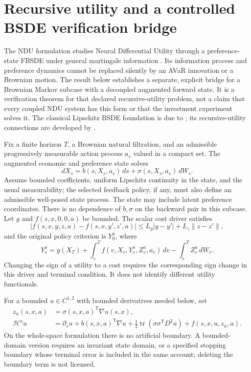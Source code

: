 \section{Recursive utility and a controlled BSDE verification bridge}\label{supp:bridge109}
The NDU formulation studies Neural Differential Utility through a preference-state FBSDE under general martingale information \citep{QiNDU2025}. Its information process and preference dynamics cannot be replaced silently by an AVaR innovation or a Brownian motion. The result below establishes a separate, explicit bridge for a Brownian Markov subcase with a decoupled augmented forward state. It is a verification theorem for that declared recursive-utility problem, not a claim that every coupled NDU system has this form or that the investment experiment solves it. The classical Lipschitz BSDE foundation is due to \citet{PardouxPeng1990}; its recursive-utility connections are developed by \citet{ElKarouiPengQuenez1997}.

Fix a finite horizon $T$, a Brownian natural filtration, and an admissible progressively measurable action process $a_s$ valued in a compact set. The augmented economic and preference state solves
\[
 dX_s=b(s,X_s,a_s)\,ds+\sigma(s,X_s,a_s)\,dW_s.
\]
Assume bounded coefficients, uniform Lipschitz continuity in the state, and the usual measurability; the selected feedback policy, if any, must also define an admissible well-posed state process. The state may include latent preference coordinates. There is no dependence of $b,\sigma$ on the backward pair in this subcase. Let $g$ and $f(s,x,0,0,a)$ be bounded. The scalar cost driver satisfies
\[
 |f(s,x,y,z,a)-f(s,x,y',z',a)|\le L_y|y-y'|+L_z\|z-z'\|,
\]
and the original policy criterion is $Y_0^a$, where
\begin{equation}\label{eq:bsde109}
 Y_s^a=g(X_T)+\int_s^T f(v,X_v,Y_v^a,Z_v^a,a_v)\,dv
                  -\int_s^T Z_v^a\,dW_v.
\end{equation}
Changing the sign of a utility to a cost requires the corresponding sign change in this driver and terminal condition. It does not identify different utility functionals.

For a bounded $u\in C^{1,2}$ with bounded derivatives needed below, set
\begin{align*}
 z_u(s,x,a)&=\sigma(s,x,a)^{\mathsf T}\nabla u(s,x),\\
 \mathcal H^a u&=\partial_su+b(s,x,a)^{\mathsf T}\nabla u
 +\tfrac12\operatorname{tr}(\sigma\sigma^{\mathsf T}D^2u)
 +f(s,x,u,z_u,a).
\end{align*}
On the whole-space formulation there is no artificial boundary. A bounded-domain version requires an invariant state domain, or a specified stopping boundary whose terminal error is included in the same account; deleting the boundary term is not licensed.

